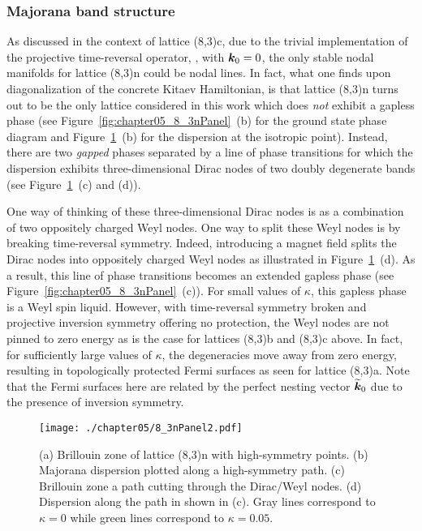 %
%
\subsubsection{Majorana band structure}
%
%
As discussed in the context of lattice (8,3)c, due to the trivial implementation of the projective time-reversal operator, \ie, with $\bm{k}_0 = 0$, the only stable nodal manifolds for lattice (8,3)n could be nodal lines.
In fact, what one finds upon diagonalization of the concrete Kitaev Hamiltonian, is that lattice (8,3)n turns out to be the only lattice considered in this work which does \textit{not} exhibit a gapless phase (see Figure~\ref{fig:chapter05_8_3nPanel}~(b) for the ground state phase diagram and Figure~\ref{fig:chapter05_8_3nPanel2}~(b) for the dispersion at the isotropic point).
Instead, there are two \textit{gapped} phases separated by a line of phase transitions for which the dispersion exhibits three-dimensional Dirac nodes of two doubly degenerate bands (see Figure~\ref{fig:chapter05_8_3nPanel2}~(c) and (d)).

One way of thinking of these three-dimensional Dirac nodes is as a combination of two oppositely charged Weyl nodes.
One way to split these Weyl nodes is by breaking time-reversal symmetry.
Indeed, introducing a magnet field splits the Dirac nodes into oppositely charged Weyl nodes as illustrated in Figure~\ref{fig:chapter05_8_3nPanel2}~(d).
As a result, this line of phase transitions becomes an extended gapless phase (see Figure~\ref{fig:chapter05_8_3nPanel}~(c)).
For small values of $\kappa$, this gapless phase is a Weyl spin liquid.
However, with time-reversal symmetry broken and projective inversion symmetry offering no protection, the Weyl nodes are not pinned to zero energy as is the case for lattices (8,3)b and (8,3)c above.
In fact, for sufficiently large values of $\kappa$, the degeneracies move away from zero energy, resulting in topologically protected Fermi surfaces as seen for lattice (8,3)a.
Note that the Fermi surfaces here are related by the perfect nesting vector $\widetilde{\bm{k}}_0$ due to the presence of inversion symmetry.
%
\begin{figure}[tb]
	\centering
	\texttt{[image: ./chapter05/8\_3nPanel2.pdf]}
	\caption{
		(a) Brillouin zone of lattice (8,3)n with high-symmetry points.
		(b) Majorana dispersion plotted along a high-symmetry path.
		(c) Brillouin zone a path cutting through the Dirac/Weyl nodes.
		(d) Dispersion along the path in shown in (c).
		Gray lines correspond to $\kappa = 0$ while green lines correspond to $\kappa = 0.05$.
	}
	\label{fig:chapter05_8_3nPanel2}
\end{figure}
%


